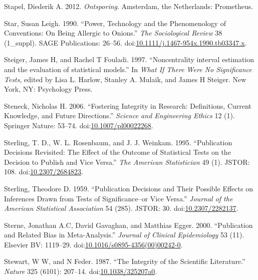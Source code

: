 \documentclass[a5paper]{book}
\begin{document}
\hypertarget{ref-isbn:9789044623123}{}
Stapel, Diederik A. 2012. \emph{Ontsporing}. Amsterdam, the Netherlands:
Prometheus.

\hypertarget{ref-doi:10.1111ux2fj.1467-954x.1990.tb03347.x}{}
Star, Susan Leigh. 1990. ``Power, Technology and the Phenomenology of
Conventions: On Being Allergic to Onions.'' \emph{The Sociological
Review} 38 (1\_suppl). SAGE Publications: 26--56.
doi:\href{https://doi.org/10.1111/j.1467-954x.1990.tb03347.x}{10.1111/j.1467-954x.1990.tb03347.x}.

\hypertarget{ref-Steiger1997-qq}{}
Steiger, James H, and Rachel T Fouladi. 1997. ``Noncentrality interval
estimation and the evaluation of statistical models.'' In \emph{What If
There Were No Significance Tests}, edited by Lisa L. Harlow, Stanley A.
Mulaik, and James H Steiger. New York, NY: Psychology Press.

\hypertarget{ref-doi:10.1007ux2fpl00022268}{}
Steneck, Nicholas H. 2006. ``Fostering Integrity in Research:
Definitions, Current Knowledge, and Future Directions.'' \emph{Science
and Engineering Ethics} 12 (1). Springer Nature: 53--74.
doi:\href{https://doi.org/10.1007/pl00022268}{10.1007/pl00022268}.

\hypertarget{ref-doi:10.2307ux2f2684823}{}
Sterling, T. D., W. L. Rosenbaum, and J. J. Weinkam. 1995. ``Publication
Decisions Revisited: The Effect of the Outcome of Statistical Tests on
the Decision to Publish and Vice Versa.'' \emph{The American
Statistician} 49 (1). JSTOR: 108.
doi:\href{https://doi.org/10.2307/2684823}{10.2307/2684823}.

\hypertarget{ref-doi:10.2307ux2f2282137}{}
Sterling, Theodore D. 1959. ``Publication Decisions and Their Possible
Effects on Inferences Drawn from Tests of Significance--or Vice Versa.''
\emph{Journal of the American Statistical Association} 54 (285). JSTOR:
30. doi:\href{https://doi.org/10.2307/2282137}{10.2307/2282137}.

\hypertarget{ref-doi:10.1016ux2fs0895-43560000242-0}{}
Sterne, Jonathan A.C, David Gavaghan, and Matthias Egger. 2000.
``Publication and Related Bias in Meta-Analysis.'' \emph{Journal of
Clinical Epidemiology} 53 (11). Elsevier BV: 1119--29.
doi:\href{https://doi.org/10.1016/s0895-4356(00)00242-0}{10.1016/s0895-4356(00)00242-0}.

\hypertarget{ref-doi:10.1038ux2f325207a0}{}
Stewart, W W, and N Feder. 1987. ``The Integrity of the Scientific
Literature.'' \emph{Nature} 325 (6101): 207--14.
doi:\href{https://doi.org/10.1038/325207a0}{10.1038/325207a0}.
\end{document}
